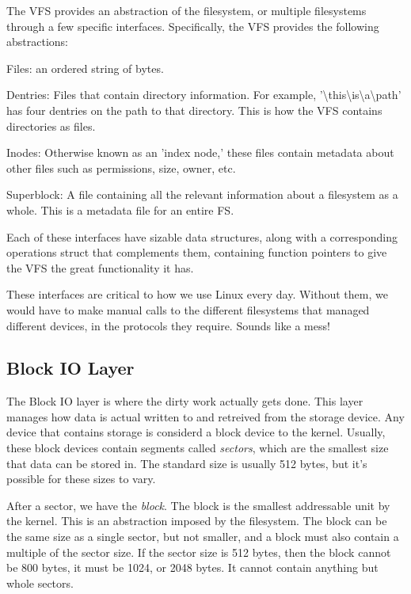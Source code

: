 \documentclass[10pt,letterpaper,onecolumn,draftclsnofoot]{IEEEtran}
\begin{document}
  The VFS provides an abstraction of the filesystem, or multiple filesystems
  through a few specific interfaces. Specifically, the VFS provides the
  following abstractions:
  \begin{description}
    \item Files: an ordered string of bytes.
    \item Dentries: Files that contain directory information. For example,
    '\textbackslash this\textbackslash is\textbackslash a\textbackslash path'
    has four dentries on the path to that directory. This is how the VFS contains
    directories as files.
    \item Inodes: Otherwise known as an 'index node,' these files contain metadata
    about other files such as permissions, size, owner, etc.
    \item Superblock: A file containing all the relevant information about a filesystem
    as a whole. This is a metadata file for an entire FS.
  \end{description}

  Each of these interfaces have sizable data structures, along with a corresponding
  operations struct that complements them, containing function pointers to give the
  VFS the great functionality it has.\cite{robertlove2010}

  These interfaces are critical to how we use Linux every day. Without them, we
  would have to make manual calls to the different filesystems that managed different
  devices, in the protocols they require. Sounds like a mess!

  \subsection{Block IO Layer}
  The Block IO layer is where the dirty work actually gets done. This layer
  manages how data is actual written to and retreived from the storage device.
  Any device that contains storage is considerd a block device to the kernel.
  Usually, these block devices contain segments called \textit{sectors}, which
  are the smallest size that data can be stored in. The standard size is usually
  512 bytes, but it's possible for these sizes to vary.

  After a sector, we have the \textit{block}. The block is the smallest addressable
  unit by the kernel. This is an abstraction imposed by the filesystem. The block
  can be the same size as a single sector, but not smaller, and a block must also
  contain a multiple of the sector size. If the sector size is 512 bytes, then the
  block cannot be 800 bytes, it must be 1024, or 2048 bytes. It cannot contain
  anything but whole sectors.
\end{document}
